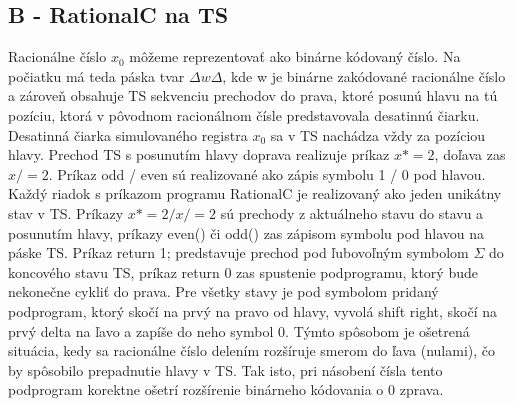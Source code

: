 \documentclass[10pt]{article}
\begin{document}
\subsection*{B - RationalC na TS}
Racionálne číslo $x_0$ môžeme reprezentovať ako binárne kódovaný číslo. Na počiatku má teda páska
tvar $\Delta w \Delta$, kde w je binárne zakódované racionálne číslo a zároveň obsahuje TS sekvenciu
prechodov do prava, ktoré posunú hlavu na tú pozíciu, ktorá v pôvodnom racionálnom čísle
predstavovala desatinnú čiarku. Desatinná čiarka simulovaného registra $x_0$ sa v TS nachádza vždy
za pozíciou hlavy.
Prechod TS s posunutím hlavy doprava realizuje príkaz $x *= 2$, doľava zas $x /= 2$. Príkaz odd /
even sú realizované ako zápis symbolu 1 / 0 pod hlavou.
Každý riadok s príkazom programu RationalC je realizovaný ako jeden unikátny stav v TS.
Príkazy $x *= 2 / x /= 2$ sú prechody z aktuálneho stavu do stavu a posunutím hlavy,
príkazy even() či odd() zas zápisom symbolu pod hlavou na páske TS.
Príkaz return 1; predstavuje prechod pod ľubovoľným symbolom $\Sigma$ do koncového stavu TS,
príkaz return 0 zas spustenie podprogramu, ktorý bude nekonečne cykliť do prava.
Pre všetky stavy je pod symbolom \Delta pridaný podprogram, ktorý skočí na prvý \Delta na pravo od
hlavy, vyvolá shift right, skočí na prvý delta na ľavo a zapíše do neho symbol 0.
Týmto spôsobom je ošetrená situácia, kedy sa racionálne číslo delením rozšíruje smerom do ľava
(nulami), čo by spôsobilo prepadnutie hlavy v TS. 
Tak isto, pri násobení čísla tento podprogram korektne ošetrí rozšírenie binárneho kódovania o 0
zprava.
\end{document}
